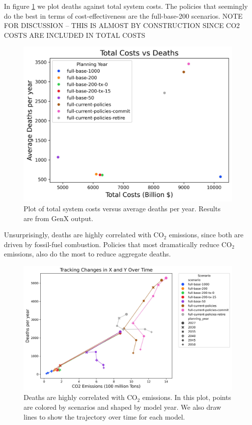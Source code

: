 \documentclass[a4paper]{article}
\theoremstyle{definition}
\theoremstyle{plain}
\begin{document}
In figure \ref{DeathsCosts} we plot deaths against total system costs.  The policies that seemingly do the best in terms of cost-effectiveness are the full-base-200 scenarios.  NOTE FOR DISCUSSION -- THIS IS ALMOST BY CONSTRUCTION SINCE CO2 COSTS ARE INCLUDED IN TOTAL COSTS
\begin{figure}
    \centering
    \includegraphics[width=0.8\linewidth]{Figures/Output/Deaths_vs_Costs_GenX.png}
    \caption{Plot of total system costs versus average deaths per year.  Results are from GenX output.}
    \label{DeathsCosts}
\end{figure}

Unsurprisingly, deaths are highly correlated with CO$_2$ emissions, since both are driven by fossil-fuel combustion.  Policies that most dramatically reduce CO$_2$ emissions, also do the most to reduce aggregate deaths.
\begin{figure}
    \centering
    \includegraphics[width=1\linewidth]{Figures/Output/Deaths_vs_Emissions_withlines_GenX.png}
    \caption{Deaths are highly correlated with CO$_2$ emissions.  In this plot, points are colored by scenarios and shaped by model year.  We also draw lines to show the trajectory over time for each model.}
    \label{DeathsEmissions}
\end{figure}
\end{document}
